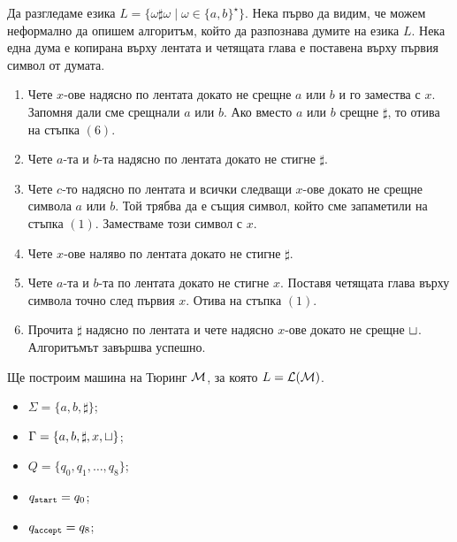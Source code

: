 \begin{example}
  Да разгледаме езика $L = \{\omega \sharp \omega \mid \omega\in\{a,b\}^\star\}$.
  Нека първо да видим, че можем неформално да опишем алгоритъм, който да разпознава думите на езика $L$.
  Нека една дума е копирана върху лентата и четящата глава е поставена върху първия символ от думата.
  \begin{enumerate}[(1)]
  \item 
    Чете $x$-ове надясно по лентата докато не срещне $a$ или $b$ и го замества с $x$.
    Запомня дали сме срещнали $a$ или $b$.
    Ако вместо $a$ или $b$ срещне $\sharp$, то отива на стъпка $(6)$.
  \item
    Чете $a$-та и $b$-та надясно по лентата докато не стигне $\sharp$. 
  \item
    Чете $c$-то надясно по лентата и всички следващи $x$-ове докато не срещне символа $a$ или $b$.
    Той трябва да е същия символ, който сме запаметили на стъпка $(1)$.
    Заместваме този символ с $x$.
  \item
    Чете $x$-ове наляво по лентата докато не стигне $\sharp$.
  \item
    Чете $a$-та и $b$-та по лентата докато не стигне $x$.
    Поставя четящата глава върху символа точно след първия $x$.
    Отива на стъпка $(1)$.
  \item
    Прочита $\sharp$ надясно по лентата и чете надясно $x$-ове докато не срещне $\sqcup$.
    Алгоритъмът завършва успешно.
  \end{enumerate}

  Ще построим машина на Тюринг $\mathcal{M}$, за която $L = \mathcal{L}(\mathcal{M})$.
  \begin{itemize}
  \item 
    $\Sigma = \{a,b,\sharp\}$;
  \item
    $\Gamma = \{a,b,\sharp,x,\sqcup\}$;
  \item
    $Q = \{q_0,q_1,\dots,q_8\}$;
  \item
    $q_{\texttt{start}} = q_0$;
  \item
    $q_{\texttt{accept}} = q_8$;
  \end{itemize}

  \begin{framed}
  \begin{figure}[H]
    \begin{center}
\end{center}
\end{figure}
\end{framed}
\end{example}
